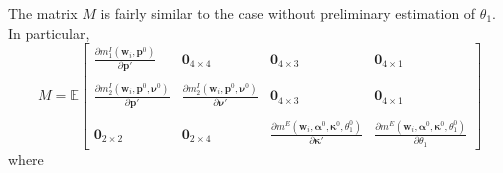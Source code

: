 \documentclass[12pt]{article}
\begin{document}
The matrix $M$ is fairly similar to the case without preliminary estimation of $\theta_1$.
In particular,
\[
  M = \mathbb{E}\left[
\begin{array}{cccc}
  \displaystyle \frac{\partial m_1^I(\mathbf{w}_i,\mathbf{p}^0)}{\partial \mathbf{p}'} & \mathbf{0}_{4\times 4} & \mathbf{0}_{4 \times 3} & \mathbf{0}_{4\times 1}\\ \\
  \displaystyle \frac{\partial m^I_2(\mathbf{w}_i, \mathbf{p}^0, \boldsymbol{\nu}^0)}{\partial \mathbf{p}'} &
  \displaystyle \frac{\partial m^I_2(\mathbf{w}_i, \mathbf{p}^0, \boldsymbol{\nu}^0)}{\partial \boldsymbol{\nu}'} &
  \mathbf{0}_{4\times 3} & \mathbf{0}_{4\times 1}\\ \\
\mathbf{0}_{2 \times 2} & \mathbf{0}_{2\times 4} & 
\displaystyle \frac{\partial m^E\left( \mathbf{w}_i, \boldsymbol{\alpha}^0, \boldsymbol{\kappa}^0, \theta_1^0 \right)}{\partial \boldsymbol{\kappa}'} & \displaystyle \frac{\partial m^E\left( \mathbf{w}_i, \boldsymbol{\alpha}^0, \boldsymbol{\kappa}^0,\theta_1^0\right)}{\partial \theta_1} 
\end{array}
\right]
\]
where 
\end{document}
